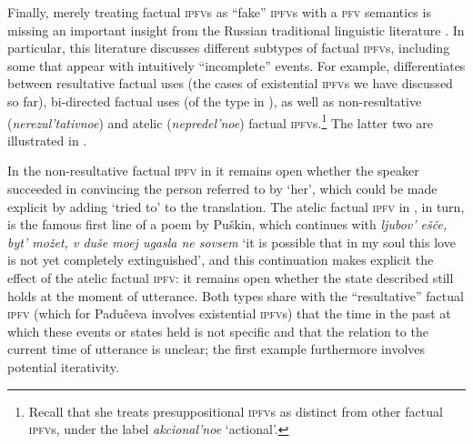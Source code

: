 \documentclass[output=paper]{langscibook}
\begin{document}
Finally, merely treating factual \textsc{ipfv}s as ``fake'' \textsc{ipfv}s with a \textsc{pfv} semantics is missing an important insight from the Russian traditional linguistic literature \citep[e.g.][]{glovinskaja81, paduceva96}. In particular, this literature discusses different subtypes of factual \textsc{ipfv}s, including some that appear with intuitively ``incomplete'' events. For example, \citet{paduceva96} differentiates between resultative factual uses (the cases of existential \textsc{ipfv}s we have discussed so far), bi-directed factual uses (of the type in ), as well as non-resultative (\textit{nerezul'tativnoe}) and atelic (\textit{nepredel'noe}) factual \textsc{ipfv}s.\footnote{Recall that she treats presuppositional \textsc{ipfv}s as distinct from other factual \textsc{ipfv}s, under the label \textit{akcional'noe} `actional'.} The latter two are illustrated in .

\ea\label{gehr:ex:OFincompl}
\label{gehr:ex:nonresOF}
\label{gehr:ex:atelOF}
\z 
\z 

\noindent In the non-resultative factual \textsc{ipfv} in  it remains open whether the speaker succeeded in convincing the person referred to by `her', which could be made explicit by adding `tried to' to the translation. The atelic factual \textsc{ipfv} in , in turn, is the famous first line of a poem by Puškin, which continues with \textit{ljubov' ešče, byt' možet, v duše moej ugasla ne sovsem} `it is possible that in my soul this love is not yet completely extinguished', and this continuation makes explicit the effect of the atelic factual \textsc{ipfv}: it remains open whether the state described still holds at the moment of utterance. Both types share with the ``resultative'' factual \textsc{ipfv} (which for Padučeva involves existential \textsc{ipfv}s) that the time in the past at which these events or states held is not specific and that the relation to the current time of utterance is unclear; the first example furthermore involves potential iterativity.  
\end{document}
